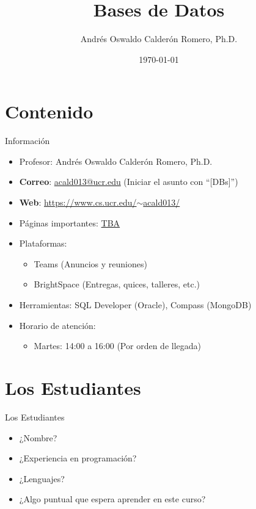 \documentclass{beamer}
\title{Bases de Datos}
\author{Andrés Oswaldo Calderón Romero, Ph.D.}
\date{\today}
\begin{document}
\frame{\titlepage}

\section{Contenido}

\begin{frame}{Información}
\begin{itemize}
    \item Profesor: Andrés Oswaldo Calderón Romero, Ph.D.
    \item \textbf{Correo}: \href{mailto:acald013@ucr.edu}{acald013@ucr.edu} (Iniciar el asunto con ``[DBs]'')\\
    \item \textbf{Web}: \href{https://www.cs.ucr.edu/~acald013/}{https://www.cs.ucr.edu/$\sim$acald013/} \\
    \item Páginas importantes: \url{TBA}
    \item Plataformas: 
    \begin{itemize}
        \item Teams (Anuncios y reuniones)
        \item BrightSpace (Entregas, quices, talleres, etc.)
    \end{itemize}
    \item Herramientas: SQL Developer (Oracle), Compass (MongoDB)
    \item Horario de atención: 
    \begin{itemize}
        \item Martes: 14:00 a 16:00 (Por orden de llegada)
    \end{itemize}
\end{itemize}
\end{frame}

\section{Los Estudiantes}

\begin{frame}{Los Estudiantes}
\begin{itemize}
    \item ¿Nombre? 
    \item ¿Experiencia en programación? 
    \item ¿Lenguajes? 
    \item ¿Algo puntual que espera aprender en este curso?
\end{itemize}
\end{frame}
\end{document}
